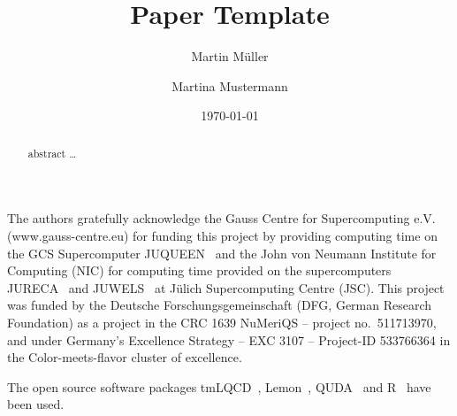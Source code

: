 \documentclass[aps,floatfix,prd,nofootinbib,superscriptaddress,reprint,showpacs,10pt,preprintnumbers,longbibliography]{revtex4-1}
\begin{document}
\title{Paper Template}
\author{Martin Müller}
\author{Martina Mustermann}
\date{\today}
\begin{abstract}
  abstract \ldots
\end{abstract}

\maketitle


\begin{acknowledgments}
  The authors gratefully acknowledge the Gauss Centre for Supercomputing
  e.V. (www.gauss-centre.eu) for funding this project by providing
  computing time on the GCS Supercomputer JUQUEEN~\cite{juqueen} and the
  John von Neumann Institute for Computing (NIC) for computing time
  provided on the supercomputers JURECA~\cite{jureca} and JUWELS~\cite{juwels} at Jülich
  Supercomputing Centre (JSC).
  This project was funded by the Deutsche Forschungsgemeinschaft (DFG,
  German Research Foundation) as a project in the CRC 1639 NuMeriQS --
  project no.\ 511713970, and under Germany’s Excellence Strategy –
  EXC 3107 – Project-ID 533766364 in the Color-meets-flavor cluster of
  excellence.

  The open source software packages tmLQCD~\cite{Jansen:2009xp,Abdel-Rehim:2013wba,Deuzeman:2013xaa}, 
  Lemon~\cite{Deuzeman:2011wz}, 
  QUDA~\cite{Clark:2009wm,Babich:2011np,Clark:2016rdz} and R~\cite{R:2019} have 
  been used.
\end{acknowledgments}


\end{document}
